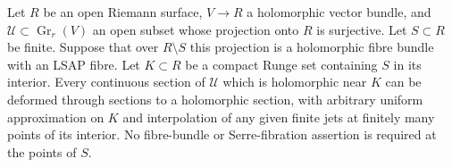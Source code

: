 \begin{lemma}\label{maps:src:F.3.10}


Let $R$ be an open Riemann surface, $V\to R$ a holomorphic vector
bundle, and $\mathscr U\subset\operatorname{Gr}_r(V)$ an open
subset whose projection onto $R$ is surjective.  Let $S\subset R$
be finite.  Suppose that over $R\setminus S$ this projection is
a holomorphic fibre bundle with an LSAP fibre.  Let $K\subset R$
be a compact Runge set containing $S$ in its interior.
Every continuous section of $\mathscr U$ which is holomorphic
near $K$ can be deformed through sections to a holomorphic
section, with arbitrary uniform approximation on $K$ and
interpolation of any given finite jets at finitely many points
of its interior.  No fibre-bundle or Serre-fibration assertion
is required at the points of $S$.

\end{lemma}


